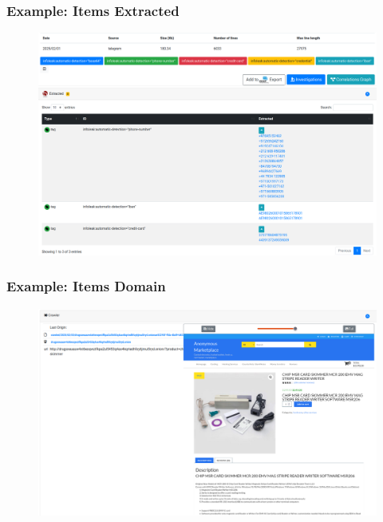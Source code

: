 \documentclass[10pt,aspectratio=169, colorlinks=true, linkcolor=circlBlue]{beamer}
\begin{document}
\begin{frame}
    \frametitle{Example: Items Extracted}
    \begin{figure}
        \includegraphics[scale=0.20, angle=0]{screenshot/item_meta.png}
    \end{figure}
\end{frame}

\begin{frame}
    \frametitle{Example: Items Domain}
    \begin{figure}
        \includegraphics[scale=0.22, angle=0]{screenshot/item_domain.png}
    \end{figure}
\end{frame}
\end{document}
